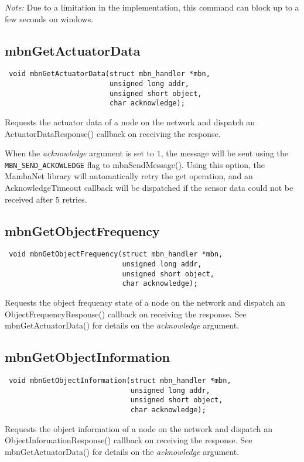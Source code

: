 \emph{Note:} Due to a limitation in the implementation, this command can block up to a few seconds on windows.


\subsection{mbnGetActuatorData}
\begin{verbatim}
 void mbnGetActuatorData(struct mbn_handler *mbn,
                         unsigned long addr,
                         unsigned short object,
                         char acknowledge);
\end{verbatim}
Requests the actuator data of a node on the network and dispatch an ActuatorDataResponse() callback on receiving the response.

When the \textit{acknowledge} argument is set to $1$, the message will be sent using the \verb|MBN_SEND_ACKOWLEDGE| flag to mbnSendMessage(). Using this option, the MambaNet library will automatically retry the get operation, and an AcknowledgeTimeout callback will be dispatched if the sensor data could not be received after 5 retries.


\subsection{mbnGetObjectFrequency}
\begin{verbatim}
 void mbnGetObjectFrequency(struct mbn_handler *mbn,
                            unsigned long addr,
                            unsigned short object,
                            char acknowledge);
\end{verbatim}
Requests the object frequency state of a node on the network and dispatch an ObjectFrequencyResponse() callback on receiving the response. See mbnGetActuatorData() for details on the \textit{acknowledge} argument.


\subsection{mbnGetObjectInformation}
\begin{verbatim}
 void mbnGetObjectInformation(struct mbn_handler *mbn,
                              unsigned long addr,
                              unsigned short object,
                              char acknowledge);
\end{verbatim}
Requests the object information of a node on the network and dispatch an ObjectInformationResponse() callback on receiving the response. See mbnGetActuatorData() for details on the \textit{acknowledge} argument.


